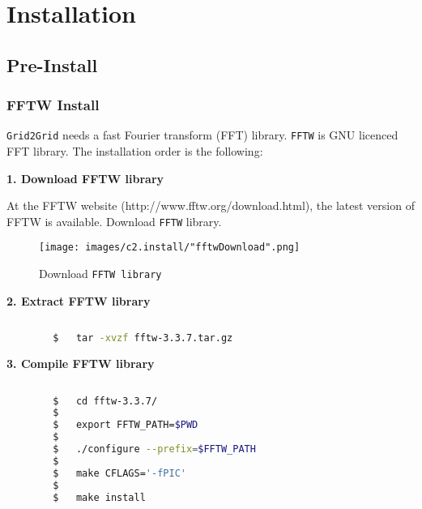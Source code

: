 \pagebreak
	\section{Installation}
	
		\subsection{Pre-Install}
		
		\subsubsection{FFTW Install}
		
		\label{chap:FFTWInstall}
		
		\texttt{Grid2Grid} needs a fast Fourier transform (FFT) library. \texttt{FFTW} is GNU licenced FFT library. The installation order is the following:
		
		\vspace{0.5cm}
		
		\textbf{1. Download FFTW library}
		
		At the FFTW website (http://www.fftw.org/download.html), the latest version of FFTW is available. Download \texttt{FFTW} library. 
		
		\vspace{0.5cm}
		{
			\begin{figure} [H]
				\centering
				\begin{tcolorbox}[standard jigsaw,opacityback=0]
				\texttt{[image: images/c2.install/"fftwDownload".png]}
				\end{tcolorbox}
				\vspace{0.3cm}
				\caption{Download \texttt{FFTW library}}			
				\label{fig:fftw3Download}
			\end{figure}
		}
		
		\pagebreak
		
		\textbf{2. Extract FFTW library}

		
		\begin{lstlisting}[language=bash]
		
		$	tar -xvzf fftw-3.3.7.tar.gz
		\end{lstlisting}
		
		\vspace{0.5cm}
		\textbf{3. Compile FFTW library}
		
		\begin{lstlisting}[language=bash]
		
		$	cd fftw-3.3.7/
		$
		$	export FFTW_PATH=$PWD
		$
		$	./configure --prefix=$FFTW_PATH		
		$
		$	make CFLAGS='-fPIC'
		$
		$	make install
		\end{lstlisting}
		
